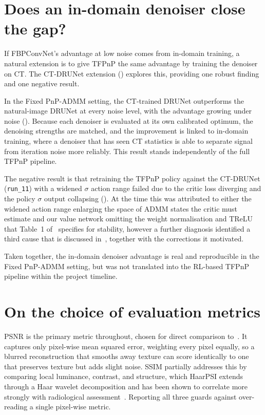 \section{Does an in-domain denoiser close the gap?}
\label{sec:in-domain-gap}

If FBPConvNet's advantage at low noise comes from in-domain training, a natural extension is to give TFPnP the same advantage by training the denoiser on CT. The CT-DRUNet extension () explores this, providing one robust finding and one negative result.

In the Fixed PnP-ADMM setting, the CT-trained DRUNet outperforms the natural-image DRUNet at every noise level, with the advantage growing under noise (). Because each denoiser is evaluated at its own calibrated optimum, the denoising strengths are matched, and the improvement is linked to in-domain training, where a denoiser that has seen CT statistics is able to separate signal from iteration noise more reliably. This result stands independently of the full TFPnP pipeline.

The negative result is that retraining the TFPnP policy against the CT-DRUNet (\texttt{run\_11}) with a widened $\sigma$ action range failed due to the critic loss diverging and the policy $\sigma$ output collapsing (). At the time this was attributed to either the widened action range enlarging the space of ADMM states the critic must estimate and our value network omitting the weight normalisation and TReLU that Table~1 of~\citet{Wei2022TFPnP} specifies for stability, however a further diagnosis identified a third cause that is discussed in~, together with the corrections it motivated.

Taken together, the in-domain denoiser advantage is real and reproducible in the Fixed PnP-ADMM setting, but was not translated into the RL-based TFPnP pipeline within the project timeline.

\section{On the choice of evaluation metrics}
\label{sec:metrics-discussion}

PSNR is the primary metric throughout, chosen for direct comparison to~\citet{Wei2022TFPnP}. It captures only pixel-wise mean squared error, weighting every pixel equally, so a blurred reconstruction that smooths away texture can score identically to one that preserves texture but adds slight noise. SSIM partially addresses this by comparing local luminance, contrast, and structure, which HaarPSI extends through a Haar wavelet decomposition and has been shown to correlate more strongly with radiological assessment~\citep{breger2025study}. Reporting all three guards against over-reading a single pixel-wise metric.

